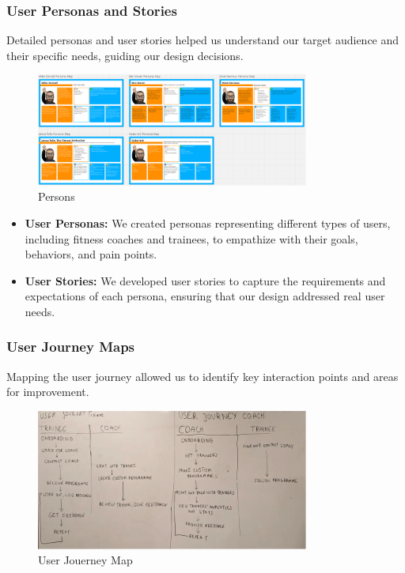 \subsubsection{User Personas and Stories}
Detailed personas and user stories helped us understand our target audience and their specific needs, guiding our design decisions.
\begin{figure}[H]
    \centering
    \includegraphics[width=0.8\textwidth]{images/personas.png}
    \caption{Persons}
    \label{fig:example_image}
  \end{figure}


\begin{itemize}
  \item \textbf{User Personas:} We created personas representing different types of users, including fitness coaches and trainees, to empathize with their goals, behaviors, and pain points.
  
  \item \textbf{User Stories:} We developed user stories to capture the requirements and expectations of each persona, ensuring that our design addressed real user needs.
\end{itemize}


\subsubsection{User Journey Maps}
Mapping the user journey allowed us to identify key interaction points and areas for improvement.

\begin{figure}[H]
    \centering
    \includegraphics[width=0.8\textwidth]{images/userjourney.png}
    \caption{User Jouerney Map}
    \label{fig:userjourney}
  \end{figure}


